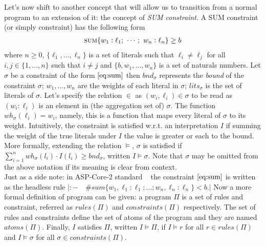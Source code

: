 Let's now shift to another concept that will allow us to 
transition from a normal program to an extension of it: the concept of \textit{SUM constraint}.
A SUM constraint (or simply constraint) has the following form
\begin{align}\label{eq:sum}
    \textsc{sum}\{w_1 : \ell_1;\ \cdots;\ w_n : \ell_n\} \geq b
\end{align}
where $n \ge 0$, $\{\ell_1, \hdots, \ell_n\}$ is a set of literals such that 
$\ell_i \ne \ell_j$ for all $i,j \in \{1, \hdots, n\}$ such that $i \ne j$
and $\{b, w_1, \hdots, w_n \}$ is a set of naturals numbers.
Let $\sigma$  be a constraint of the form $\ref{eq:sum}$ then $\mathit{bnd}_{\sigma}$
represents the \textit{bound} of the constraint $\sigma$; $w_1, \hdots, w_n$
are the weights of each literal in $\sigma$; $lits_{\sigma}$ is the set of literals of $\sigma$.
Let's specify the relation $\in$ as $(w_i, \ell_i) \in \sigma$ to be read  
as $(w_i : \ell_i)$ is an element in (the aggregation set of) $\sigma$.
The function $\mathit{wh_{\sigma}}(\ell_i) = w_i$, namely, this is a function that 
maps every literal of $\sigma$ to its weight.
Intuitively, the constraint is satisfied w.r.t. an interpretation $I$ 
if summing the weight of the true literals under $I$ the value is greater
or each to the bound.
More formally, extending the relation $\models$, $\sigma$ is satisfied if 
$\sum_{i=1}^{n} \mathit{wh}_{\sigma}(l_i) \cdot I(l_i) \ge \mathit{bnd}_{\sigma}$,
written $I \models \sigma$.
Note that $\sigma$ may be omitted from the above notation if its meaning is clear from context.\\
Just as a side note: in ASP-Core-2 standard
~\cite{DBLP:journals/tplp/CalimeriFGIKKLM20} 
the constraint  $\ref{eq:sum}$ is written as the headless rule
$|:- \quad \#sum\{w_1,\ell_1 : \ell_1; ...; w_n,\ell_n : \ell_n\} < b.|$ 
Now a more formal definition of program can be given:
a program $\Pi$ is a set of rules and constraint, referred as $\mathit{rules}(\Pi)$ 
and $\mathit{constraints}(\Pi)$ respectively.
The set of rules and constraints define the set of atoms of the program and they are named $\mathit{atoms}(\Pi)$.
Finally, $I$ satisfies $\Pi$, written $I \models \Pi$, if $I \models r$ for all $r \in \mathit{rules}(\Pi)$
and $I \models \sigma$ for all $\sigma \in \mathit{constraints}(\Pi)$.

